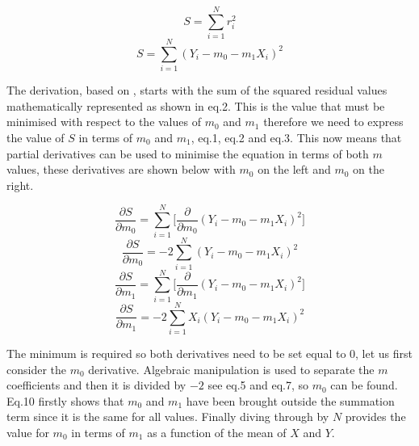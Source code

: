 \documentclass[11pt]{article}
\begin{document}
\begin{figure}
\begin{equation}
S=\sum\limits_{i=1}^N r_i^2
\end{equation}
\begin{equation}
S=\sum\limits_{i=1}^N (Y_i-m_0 -m_1X_i)^2
\end{equation}
\end{figure} 
\noindent The derivation, based on \cite{linregdev}, starts with the sum of the squared residual values mathematically represented as shown in eq.2. This is the value that must be minimised with respect to the values of $m_0$ and $m_1$ therefore we need to express the value of $S$ in terms of $m_0$ and $m_1$, eq.1, eq.2 and eq.3. This now means that partial derivatives can be used to minimise the equation in terms of both $m$ values, these derivatives are shown below with $m_0$ on the left and $m_0$ on the right.

\begin{figure}[h]
\begin{equation}
\frac{\partial S}{\partial m_0} = \sum\limits_{i=1}^N \Big[ \frac{\partial }{\partial m_0} (Y_i-m_0 -m_1X_i)^2 \Big]
\end{equation} 
\begin{equation}
\frac{\partial S}{\partial m_0} = -2\sum\limits_{i=1}^N (Y_i-m_0 -m_1X_i)^2 
\end{equation} 
\endminipage\hfill
{}%
\begin{equation}
\frac{\partial S}{\partial m_1} = \sum\limits_{i=1}^N \Big[ \frac{\partial }{\partial m_1} (Y_i-m_0 -m_1X_i)^2 \Big]
\end{equation}
\begin{equation}
\frac{\partial S}{\partial m_1} = -2\sum\limits_{i=1}^N X_i(Y_i-m_0 -m_1X_i)^2 
\end{equation}
\endminipage
\end{figure}
The minimum is required so both derivatives need to be set equal to 0, let us first consider the $m_0$ derivative. Algebraic manipulation is used to separate the $m$ coefficients and then it is divided by $-2$ see eq.5 and eq.7, so $m_0$ can be found. Eq.10 firstly shows that $m_0$ and $m_1$ have been brought outside the summation term since it is the same for all values. Finally diving through by $N$ provides the value for $m_0$ in terms of $m_1$ as a function of the mean of $X$ and $Y$.
\end{document}
